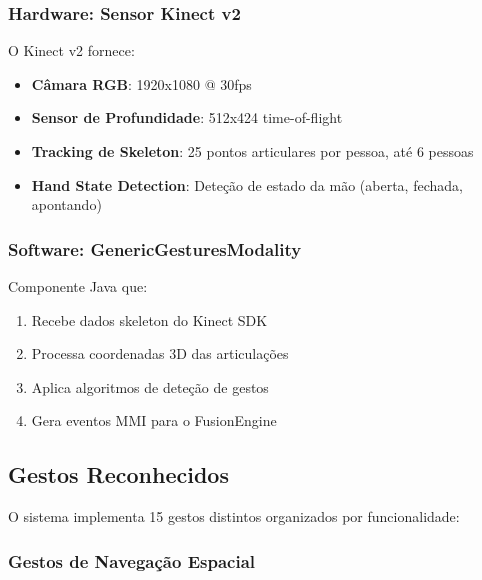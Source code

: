 \subsubsection{Hardware: Sensor Kinect v2}

O Kinect v2 fornece:
\begin{itemize}
    \item \textbf{Câmara RGB}: 1920x1080 @ 30fps
    \item \textbf{Sensor de Profundidade}: 512x424 time-of-flight
    \item \textbf{Tracking de Skeleton}: 25 pontos articulares por pessoa, até 6 pessoas
    \item \textbf{Hand State Detection}: Deteção de estado da mão (aberta, fechada, apontando)
\end{itemize}

\subsubsection{Software: GenericGesturesModality}

Componente Java que:
\begin{enumerate}
    \item Recebe dados skeleton do Kinect SDK
    \item Processa coordenadas 3D das articulações
    \item Aplica algoritmos de deteção de gestos
    \item Gera eventos MMI para o FusionEngine
\end{enumerate}

\subsection{Gestos Reconhecidos}

O sistema implementa 15 gestos distintos organizados por funcionalidade:

\subsubsection{Gestos de Navegação Espacial}

